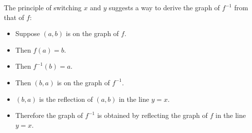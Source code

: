 \begin{frame}
The principle of switching $x$ and $y$ suggests a way to derive the graph of $f^{-1}$ from that of $f$:
\begin{itemize}
\item<2->  Suppose $(a,b)$ is on the graph of $f$.
\item<3->  Then $f(a) = b$.
\item<4->  Then $f^{-1}(b) = a$.
\item<5->  Then $(b,a)$ is on the graph of $f^{-1}$.
\item<6->  $(b,a)$ is the reflection of $(a,b)$ in the line $y = x$.
\item<7->  Therefore the graph of $f^{-1}$ is obtained by reflecting the graph of $f$ in the line $y = x$.
\end{itemize}
\end{frame}

